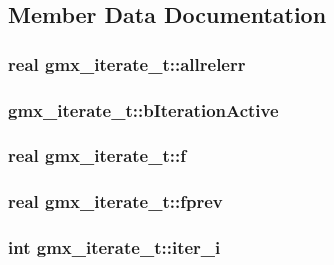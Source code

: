 \subsection{\-Member \-Data \-Documentation}
\hypertarget{structgmx__iterate__t_a3cc926b6b2ec1b040cda0e2d71cca01a}{
\subsubsection[{allrelerr}]{\setlength{\rightskip}{0pt plus 5cm}real {\bf gmx\-\_\-iterate\-\_\-t\-::allrelerr}}}\label{structgmx__iterate__t_a3cc926b6b2ec1b040cda0e2d71cca01a}
\hypertarget{structgmx__iterate__t_a53d6320278da52a52b7aef07a7bfdaa3}{
\subsubsection[{b\-Iteration\-Active}]{ {\bf gmx\-\_\-iterate\-\_\-t\-::b\-Iteration\-Active}}}\label{structgmx__iterate__t_a53d6320278da52a52b7aef07a7bfdaa3}
\hypertarget{structgmx__iterate__t_aee8facfc5853f9c81c57bea152fd1847}{
\subsubsection[{f}]{\setlength{\rightskip}{0pt plus 5cm}real {\bf gmx\-\_\-iterate\-\_\-t\-::f}}}\label{structgmx__iterate__t_aee8facfc5853f9c81c57bea152fd1847}
\hypertarget{structgmx__iterate__t_a4bc373e4979757f3471b05bd3c2f8627}{
\subsubsection[{fprev}]{\setlength{\rightskip}{0pt plus 5cm}real {\bf gmx\-\_\-iterate\-\_\-t\-::fprev}}}\label{structgmx__iterate__t_a4bc373e4979757f3471b05bd3c2f8627}
\hypertarget{structgmx__iterate__t_a05b50eeb5cf95e1e403fcbfed87ac65a}{
\subsubsection[{iter\-\_\-i}]{\setlength{\rightskip}{0pt plus 5cm}int {\bf gmx\-\_\-iterate\-\_\-t\-::iter\-\_\-i}}}\label{structgmx__iterate__t_a05b50eeb5cf95e1e403fcbfed87ac65a}

